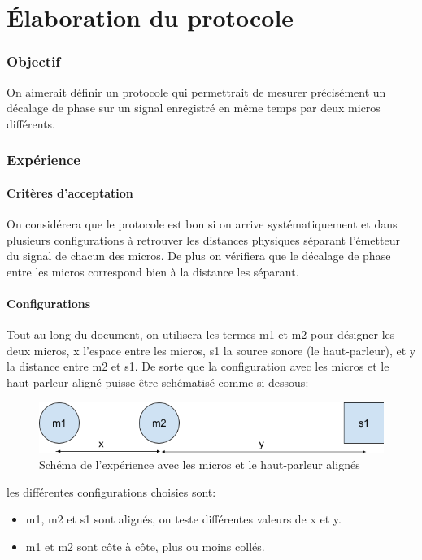 \documentclass[12pt,a4paper]{article}
\author{Baptiste Lesquoy}
\begin{document}
\part{Élaboration du protocole}
\section{Objectif}
On aimerait définir un protocole qui permettrait de mesurer précisément un décalage de phase sur un signal enregistré en même temps par deux micros différents.


\section{Expérience}
\subsection{Critères d'acceptation}
On considérera que le protocole est bon si on arrive systématiquement et dans plusieurs configurations à retrouver les distances physiques séparant l'émetteur du signal de chacun des micros. De plus on vérifiera que le décalage de phase entre les micros correspond bien à la distance les séparant.

\subsection{Configurations}
Tout au long du document, on utilisera les termes m1 et m2 pour désigner les deux micros, x l'espace entre les micros, s1 la source sonore (le haut-parleur), et y la distance entre m2 et s1. De sorte que la configuration avec les micros et le haut-parleur aligné puisse être schématisé comme si dessous:
\begin{figure}[H]
\includegraphics[width=\textwidth]{../24-02-16/mesures/m1/schema.png} 
\caption{Schéma de l'expérience avec les micros et le haut-parleur alignés}
\end{figure}
les différentes configurations choisies sont:
\begin{itemize}
\item m1, m2 et s1 sont alignés, on teste différentes valeurs de x et y.
\item m1 et m2 sont côte à côte, plus ou moins collés.
\end{itemize}
\end{document}
